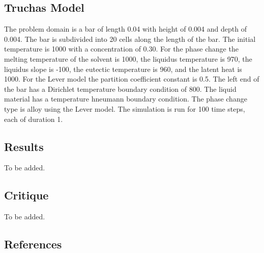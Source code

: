 \documentclass[12pt]{article}
\begin{document}
\subsection*{Truchas Model}

The problem domain is a bar of length 0.04 with height of 0.004 and depth of 0.004.  The bar is subdivided into 20 cells along the length of the bar.  The initial temperature is 1000 with a concentration of 0.30.  For the phase change the melting temperature of the solvent is 1000, the liquidus temperature is 970, the liquidus slope is -100, the eutectic temperature is 960, and the latent heat is 1000.  For the Lever model the partition coefficient constant is 0.5.  The left end of the bar has a Dirichlet temperature boundary condition of 800.  The liquid material has a temperature hneumann boundary condition.  The phase change type is alloy using the Lever model.  The simulation is run for 100 time steps, each of duration 1.

\subsection*{Results}

To be added.

\subsection*{Critique}

To be added.

\subsection*{References}
\end{document}
